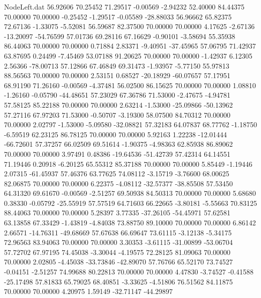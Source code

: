 \begin{filecontents}{NodeLeft.dat}
  56.92606   70.25452   71.29517    -0.00569   -2.94232   52.40000   84.44375   70.00000   70.00000   -0.25452   -1.29517   -0.05589  -28.88033
  56.96662   65.82375   72.67136    -1.33075   -5.52081   56.59687   82.37500   70.00000   70.00000    4.17625   -2.67136  -13.20097  -54.76599
  57.01736   69.28116   67.16629    -0.90101   -3.58694   55.35938   86.44063   70.00000   70.00000    0.71884    2.83371   -9.40951  -37.45965
  57.06795   71.42937   63.87695     0.24499   -7.45469   53.07188   91.20625   70.00000   70.00000   -1.42937    6.12305    2.56366  -78.00713
  57.12866   67.46849   69.31473    -1.93957   -5.77150   55.97813   88.56563   70.00000   70.00000    2.53151    0.68527  -20.18929  -60.07657
  57.17951   68.91190   71.26160    -0.00569   -4.37481   56.02500   86.15625   70.00000   70.00000    1.08810   -1.26160   -0.05790  -44.48651
  57.23029   67.36786   71.53000    -2.47675   -4.94781   57.58125   85.22188   70.00000   70.00000    2.63214   -1.53000  -25.09866  -50.13962
  57.27116   67.97203   71.53000    -0.50707   -3.19300   58.07500   84.70312   70.00000   70.00000    2.02797   -1.53000   -5.09580  -32.08821
  57.32183   64.07837   68.77762    -1.18750   -6.59519   62.23125   86.78125   70.00000   70.00000    5.92163    1.22238  -12.01444  -66.72601
  57.37257   66.02509   69.51614    -1.90375   -4.98363   62.85938   86.89062   70.00000   70.00000    3.97491    0.48386  -19.64536  -51.42739
  57.42314   64.14551   71.19446     0.20918   -6.20125   65.55312   85.37188   70.00000   70.00000    5.85449   -1.19446    2.07315  -61.45937
  57.46376   63.77625   74.08112    -3.15719   -3.76600   68.00625   82.06875   70.00000   70.00000    6.22375   -4.08112  -32.57377  -38.85508
  57.53450   64.31320   69.61670    -0.00569   -2.51257   69.50938   84.50313   70.00000   70.00000    5.68680    0.38330   -0.05792  -25.55919
  57.57519   64.71603   66.22665    -3.80181   -5.55663   70.83125   88.44063   70.00000   70.00000    5.28397    3.77335  -37.26105  -54.45971
  57.62581   63.13858   67.33429    -1.43819   -4.84038   73.88750   89.10000   70.00000   70.00000    6.86142    2.66571  -14.76311  -49.68669
  57.67638   66.69647   73.61115    -3.12138   -5.34175   72.96563   83.94063   70.00000   70.00000    3.30353   -3.61115  -31.00899  -53.06704
  57.72702   67.97195   74.45038    -3.30044   -4.19575   72.28125   81.09063   70.00000   70.00000    2.02805   -4.45038  -33.73846  -42.89070
  57.76766   65.52170   73.74527    -0.04151   -2.51257   74.99688   80.22813   70.00000   70.00000    4.47830   -3.74527   -0.41588  -25.17498
  57.81833   65.79025   68.40851    -3.33625   -4.51806   76.51562   84.11875   70.00000   70.00000    4.20975    1.59149  -32.71147  -44.29897

\end{filecontents}
